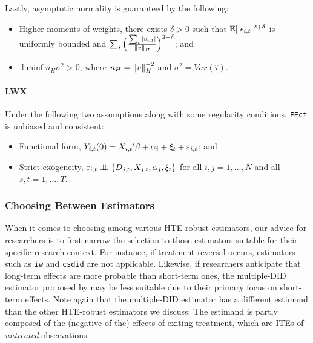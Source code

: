 \documentclass[12pt]{article}
\begin{document}
Lastly, asymptotic normality is guaranteed by the following:
\begin{itemize}
    \item Higher moments of weights, there exists $\delta > 0$ such that $\mathbb{E}[\vert \epsilon_{i,t}\vert^{2+\delta}$ is uniformly bounded and $\sum_i \Big(\frac{\sum_t\vert v_{i,t} \vert}{\left\Vert{v} \right\Vert_H}\Big)^{2+\delta}$; and
    \item $\liminf n_H \sigma^2>0$, where $n_H=\left\Vert{v} \right\Vert_H^{-2}$ and $\sigma^2 = Var(\hat\tau)$.
\end{itemize}








\paragraph*{LWX \citeyearpar{LWX2022}} 
Under the following two assumptions along with some regularity conditions, \texttt{FEct} is unbiased and consistent:
\begin{itemize}
    \item Functional form, $Y_{i,t}(0)=X_{i,t}{'}\beta + \alpha_i + \xi_t + \varepsilon_{i,t}$; and
    \item Strict exogeneity, $\epit\indep\{D_{j,t},X_{j,t}, \alpha_j, \xi_t\}$ for all $i,j=1,\dots,N$ and all $s,t=1,\dots,T$.
\end{itemize}


\subsubsection{Choosing Between Estimators}

When it comes to choosing among various HTE-robust estimators, our advice for researchers is to first narrow the selection to those estimators suitable for their specific research context. For instance, if treatment reversal occurs, estimators such as \texttt{iw} and \texttt{csdid} are not applicable. Likewise, if researchers anticipate that long-term effects are more probable than short-term ones, the multiple-DID estimator proposed by \citet{CDH2020} may be less suitable due to their primary focus on short-term effects. Note again that the multiple-DID estimator has a different estimand than the other HTE-robust estimators we discuss: The estimand is partly composed of the (negative of the) effects of exiting treatment, which are ITEs of \emph{untreated} observations.
\end{document}
